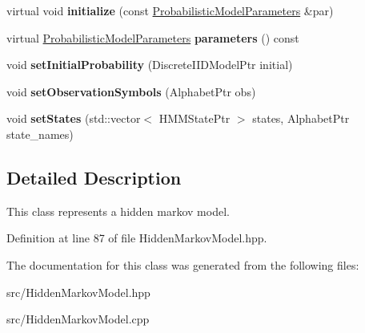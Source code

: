 \begin{DoxyCompactItemize}
\mbox{\label{classtops_1_1HiddenMarkovModel_a6c740f4636089a6f00ef7bd2b003776c}} 
virtual void {\bfseries initialize} (const \hyperlink{classtops_1_1ProbabilisticModelParameters}{Probabilistic\+Model\+Parameters} \&par)
\item 
\mbox{\label{classtops_1_1HiddenMarkovModel_aa1c80eb4146eef79479e17a44080b007}} 
virtual \hyperlink{classtops_1_1ProbabilisticModelParameters}{Probabilistic\+Model\+Parameters} {\bfseries parameters} () const
\item 
\mbox{\label{classtops_1_1HiddenMarkovModel_a853efd44bf73847922ccd3e609db6375}} 
void {\bfseries set\+Initial\+Probability} (Discrete\+I\+I\+D\+Model\+Ptr initial)
\item 
\mbox{\label{classtops_1_1HiddenMarkovModel_a2dd9a3e56636668d520f87b573d81a59}} 
void {\bfseries set\+Observation\+Symbols} (Alphabet\+Ptr obs)
\item 
\mbox{\label{classtops_1_1HiddenMarkovModel_aa74124e3104fadb71ea3df7ce58f6700}} 
void {\bfseries set\+States} (std\+::vector$<$ H\+M\+M\+State\+Ptr $>$ states, Alphabet\+Ptr state\+\_\+names)
\end{DoxyCompactItemize}


\subsection{Detailed Description}
This class represents a hidden markov model. 

Definition at line 87 of file Hidden\+Markov\+Model.\+hpp.



The documentation for this class was generated from the following files\+:\begin{DoxyCompactItemize}
\item 
src/Hidden\+Markov\+Model.\+hpp\item 
src/Hidden\+Markov\+Model.\+cpp\end{DoxyCompactItemize}
